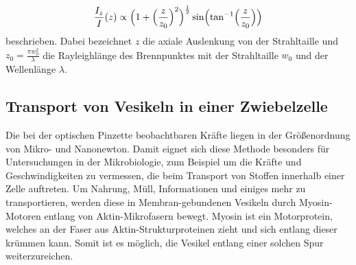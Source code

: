 \begin{equation}
    \frac{I_z}{I}(z)\propto \Bigl( 1 + \Bigl(\frac{z}{z_0}\Bigr)^2 \Bigr)^{\frac{1}{2}}\sin\Bigl(\tan^{-1}\Bigl(\frac{z}{z_0}\Bigr)\Bigr)
    \label{eq:A1}
\end{equation}
beschrieben. Dabei bezeichnet $z$ die axiale Auslenkung von der Strahltaille
und $z_0=\frac{\pi w_0^2}{\lambda}$ die Rayleighlänge des Brennpunktes mit der Strahltaille $w_0$ und der Wellenlänge $\lambda$.
\subsection{Transport von Vesikeln in einer Zwiebelzelle}
Die bei der optischen Pinzette beobachtbaren Kräfte liegen in der Größenordnung von Mikro- und Nanonewton.
Damit eignet sich diese Methode besonders für Untersuchungen in der Mikrobiologie, zum Beispiel um die Kräfte und Geschwindigkeiten zu vermessen,
die beim Transport von Stoffen innerhalb einer Zelle auftreten.
Um Nahrung, Müll, Informationen und einiges mehr zu transportieren,
werden diese in Membran-gebundenen Vesikeln durch Myosin-Motoren entlang von Aktin-Mikrofasern bewegt.
Myosin ist ein Motorprotein, welches an der Faser aus Aktin-Strukturproteinen zieht und sich entlang dieser krümmen kann.
Somit ist es möglich, die Vesikel entlang einer solchen Spur weiterzureichen.
